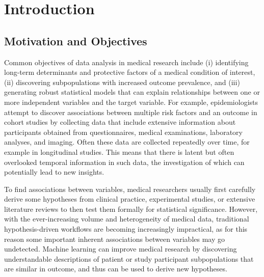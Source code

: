 \documentclass[
  oneside]{book}
\begin{document}
\hypertarget{intro}{%
\chapter{Introduction}\label{intro}}

\hypertarget{motivation-and-objectives}{%
\section{Motivation and Objectives}\label{motivation-and-objectives}}

Common objectives of data analysis in medical research include (i) identifying long-term determinants and protective factors of a medical condition of interest, (ii) discovering subpopulations with increased outcome prevalence, and (iii) generating robust statistical models that can explain relationships between one or more independent variables and the target variable.
For example, epidemiologists attempt to discover associations between multiple risk factors and an outcome in cohort studies by collecting data that include extensive information about participants obtained from questionnaires, medical examinations, laboratory analyses, and imaging.
Often these data are collected repeatedly over time, for example in longitudinal studies.
This means that there is latent but often overlooked temporal information in such data, the investigation of which can potentially lead to new insights.

To find associations between variables, medical researchers usually first carefully derive some hypotheses from clinical practice, experimental studies, or extensive literature reviews to then test them formally for statistical significance.
However, with the ever-increasing volume and heterogeneity of medical data, traditional hypothesis-driven workflows are becoming increasingly impractical, as for this reason some important inherent associations between variables may go undetected.
Machine learning can improve medical research by discovering understandable descriptions of patient or study participant subpopulations that are similar in outcome, and thus can be used to derive new hypotheses.
\end{document}
